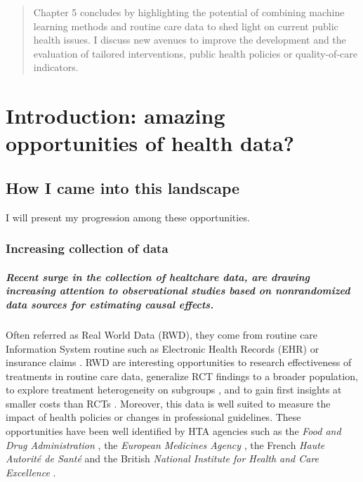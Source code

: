 \documentclass{report}
\begin{document}
\begin{abstract}
  Chapter 5 concludes by highlighting the potential of combining machine
  learning methods and routine care data to shed light on current public health
  issues. I discuss new avenues to improve the development and the evaluation of
  tailored interventions, public health policies or quality-of-care indicators.

\end{abstract}

\tableofcontents




\chapter{Introduction: amazing opportunities of health data?}\label{chap:intro}
\section{How I came into this landscape}\label{sec:intro:landscape}


I will present my progression among these opportunities.

\subsection{Increasing collection of data}


\paragraph{Recent surge in the collection of healtchare data, are drawing
  increasing attention to observational studies based on nonrandomized data
  sources for estimating causal effects.} Often referred as Real World Data
(RWD), they come from routine care Information System routine such as
Electronic Health Records (EHR) or insurance claims \citep{wang2023emulation}.
RWD are interesting opportunities to research effectiveness of treatments in
routine care data, generalize RCT findings to a broader population, to explore
treatment heterogeneity on subgroups \citep{mant1999can, desai2021broadening},
and to gain first insights at smaller costs than RCTs
\citep{black1996we,bosdriesz2020evidence}. Moreover, this data is well suited
to measure the impact of health policies or changes in professional
guidelines. These opportunities have been well identified by HTA agencies such
as the \textit{Food and Drug Administration}
\citep{desai2021broadening,fda_real-world_2021}, the \textit{European
  Medicines Agency} \citep{flynn_marketing_2022}, the French \textit{Haute
  Autorité de Santé} \citep{vanier2023rapid} and the British \textit{National
  Institute for
  Health and Care Excellence} \citep{kent_nice_2022}.
\end{document}
